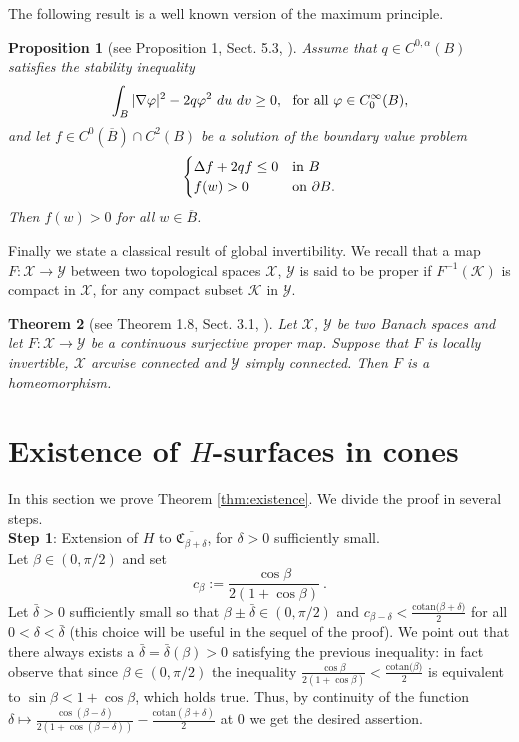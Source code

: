 \documentclass[a4paper,reqno,10pt,oneside]{amsart}
\numberwithin{equation}{section}
\newtheorem{theorem}{Theorem}[section]
\newtheorem{proposition}[theorem]{Proposition}
\begin{document}
The following result is a well known version of the maximum principle.
\begin{proposition}[see Proposition 1, Sect. 5.3, \cite{MinSurf}] \label{propstabsegnpos} 
Assume that $q \in C^{0,\alpha}(B)$ satisfies the stability inequality
$$\displaystyle \int_B |\nabla \varphi|^2 - 2 q \varphi^2 \ du \ dv \geq 0, \ \ \hbox{for all} \ \varphi \in C_0^{\infty}(B),$$
and let $f \in C^0(\overline{B})\cap C^2(B)$ be a solution of the boundary value problem
\begin{equation}\label{probstab}
\begin{cases}
\Delta f + 2qf \leq 0 & \hbox{in} \ B\\
f(w)>0 &  \hbox{on} \ \partial B.
\end{cases}
\end{equation}
Then $f(w)>0$ for all $w \in \overline{B}$.
\end{proposition}

Finally we state a classical result of global invertibility. We recall that a map $F\colon\mathcal{X}\to \mathcal{Y}$ between two topological spaces $\mathcal{X}$, $\mathcal{Y}$ is said to be proper if $F^{-1}(\mathcal{K})$ is compact in $\mathcal{X}$, for any compact subset $\mathcal{K}$ in $\mathcal{Y}$.

\begin{theorem}[see Theorem 1.8, Sect. 3.1, \cite{AmbrosettiProdi}] \label{globalinvtheo}
Let $\mathcal{X}$, $\mathcal{Y}$ be two Banach spaces and let $F\colon\mathcal{X}\to \mathcal{Y}$ be a continuous surjective proper map. Suppose that $F$ is locally invertible, $\mathcal{X}$ arcwise connected and $\mathcal{Y}$ simply connected. Then $F$ is a homeomorphism.
\end{theorem}

\section{Existence of $H$-surfaces in cones}

In this section we prove Theorem \ref{thm:existence}.  
We divide the proof in several steps.\\

\noindent\textbf{Step 1}: Extension of $H$ to $\overline{\mathfrak{C}_{\beta+ \delta}}$, for $\delta>0$ sufficiently small.\\
Let $\beta \in (0,\pi/2)$ and set 
$$
c_\beta:=\frac{\cos \beta}{2(1+\cos \beta)}~\!.
$$
Let $\bar\delta>0$ sufficiently small so that $\beta \pm \bar\delta \in (0,\pi/2)$ and $ c_{\beta-\delta} < \frac{\mathrm{cotan}{(\beta+\delta})}{2}$ for all $0<\delta<\bar\delta$ (this choice will be useful in the sequel of the proof). We point out that there always exists a $\bar\delta=\bar\delta(\beta)>0$ satisfying the previous inequality: in fact observe that since $\beta \in (0,\pi/2)$ the inequality $\frac{\cos \beta}{2(1+\cos \beta)} < \frac{\mathrm{cotan}{(\beta})}{2}$ is equivalent to $\sin \beta  < 1 + \cos \beta$, which holds true. Thus, by continuity of the function $\delta \mapsto \frac{\cos (\beta-\delta)}{2(1+\cos (\beta-\delta))} - \frac{\mathrm{cotan}{(\beta + \delta)}}{2}$ at $0$ we get the desired assertion.\\
\end{document}
